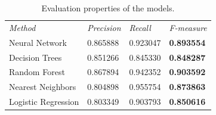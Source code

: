 \documentclass[a4paper, 12pt]{report}
\theoremstyle{definition}
\begin{document}
\begin{center}
    \begin{table}[h!]
    \centering
        \renewcommand{\arraystretch}{2}
        \begin{tabular}{ p{4cm}  p{2cm}  p{2cm}  p{2cm} }
        \textit{Method} & \textit{Precision} & \textit{Recall} & \textit{F-measure} \\
            Neural Network & 0.865888  & 0.923047 & \textbf{0.893554} \\
            Decision Trees & 0.851266 & 0.845330 & \textbf{0.848287} \\
            Random Forest & 0.867894 & 0.942352 & \textbf{0.903592}\\
            Nearest Neighbors & 0.804898 & 0.955754 & \textbf{0.873863} \\
            Logistic Regression & 0.803349 & 0.903793 & \textbf{0.850616} \\
        \end{tabular}
        \caption{\label{tab:models} Evaluation properties of the models.}
    \end{table}
\end{center}
\end{document}
